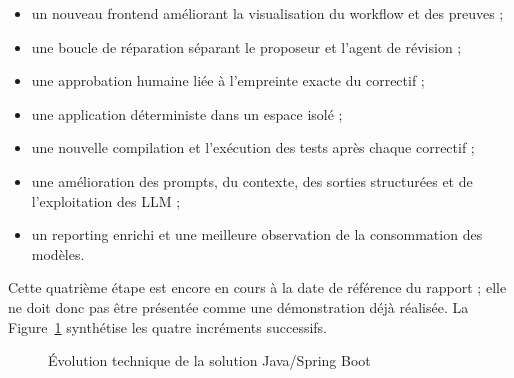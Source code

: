 \begin{itemize}
    \item un nouveau frontend améliorant la visualisation du workflow et des preuves ;
    \item une boucle de réparation séparant le proposeur et l'agent de révision ;
    \item une approbation humaine liée à l'empreinte exacte du correctif ;
    \item une application déterministe dans un espace isolé ;
    \item une nouvelle compilation et l'exécution des tests après chaque correctif ;
    \item une amélioration des prompts, du contexte, des sorties structurées et de l'exploitation des LLM ;
    \item un reporting enrichi et une meilleure observation de la consommation des modèles.
\end{itemize}

Cette quatrième étape est encore en cours à la date de référence du rapport ; elle ne doit donc pas être présentée comme une démonstration déjà réalisée. La Figure~\ref{fig:evolution-technique-java-ch4} synthétise les quatre incréments successifs.

\begin{figure}[H]
    \centering
    \caption{Évolution technique de la solution Java/Spring Boot}
    \label{fig:evolution-technique-java-ch4}
\end{figure}

